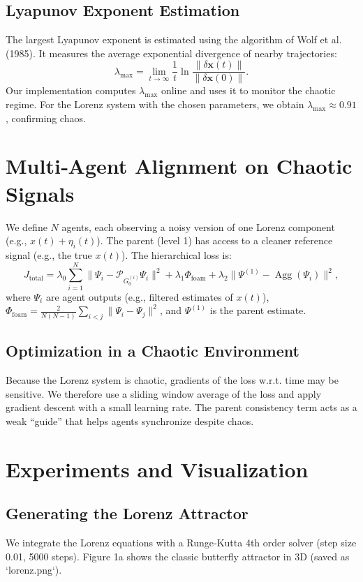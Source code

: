 \documentclass[12pt,a4paper]{article}
\begin{document}
\subsection{Lyapunov Exponent Estimation}
The largest Lyapunov exponent is estimated using the algorithm of Wolf et al. (1985). It measures the average exponential divergence of nearby trajectories:
\[
\lambda_{\max} = \lim_{t\to\infty} \frac{1}{t} \ln \frac{\|\delta \mathbf{x}(t)\|}{\|\delta \mathbf{x}(0)\|}.
\]
Our implementation computes \(\lambda_{\max}\) online and uses it to monitor the chaotic regime. For the Lorenz system with the chosen parameters, we obtain \(\lambda_{\max} \approx 0.91\), confirming chaos.

\section{Multi‑Agent Alignment on Chaotic Signals}
We define \(N\) agents, each observing a noisy version of one Lorenz component (e.g., \(x(t) + \eta_i(t)\)). The parent (level 1) has access to a cleaner reference signal (e.g., the true \(x(t)\)). The hierarchical loss is:
\[
J_{\text{total}} = \lambda_0 \sum_{i=1}^N \| \Psi_i - \mathcal{P}_{G_0^{(i)}} \Psi_i \|^2 + \lambda_1 \Phi_{\text{foam}} + \lambda_2 \| \Psi^{(1)} - \operatorname{Agg}(\Psi_i) \|^2,
\]
where \(\Psi_i\) are agent outputs (e.g., filtered estimates of \(x(t)\)), \(\Phi_{\text{foam}} = \frac{2}{N(N-1)}\sum_{i<j} \| \Psi_i - \Psi_j \|^2\), and \(\Psi^{(1)}\) is the parent estimate.

\subsection{Optimization in a Chaotic Environment}
Because the Lorenz system is chaotic, gradients of the loss w.r.t. time may be sensitive. We therefore use a sliding window average of the loss and apply gradient descent with a small learning rate. The parent consistency term acts as a weak “guide” that helps agents synchronize despite chaos.

\section{Experiments and Visualization}
\subsection{Generating the Lorenz Attractor}
We integrate the Lorenz equations with a Runge‑Kutta 4th order solver (step size 0.01, 5000 steps). Figure 1a shows the classic butterfly attractor in 3D (saved as `lorenz.png`).
\end{document}

